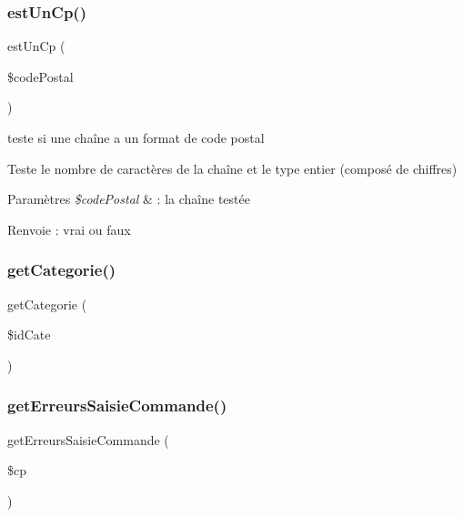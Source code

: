 \subsubsection{\texorpdfstring{est\+Un\+Cp()}{estUnCp()}}
{\footnotesize\ttfamily est\+Un\+Cp (\begin{DoxyParamCaption}\item[{}]{\$code\+Postal }\end{DoxyParamCaption})}

teste si une chaîne a un format de code postal

Teste le nombre de caractères de la chaîne et le type entier (composé de chiffres) 
\begin{DoxyParams}{Paramètres}
{\em \$code\+Postal} & \+: la chaîne testée \\
\hline
\end{DoxyParams}
\begin{DoxyReturn}{Renvoie}
\+: vrai ou faux 
\end{DoxyReturn}
\mbox{\label{fonctions_8inc_8php_a230dfdd0d0b7c24d309159bfd802ff2a}} 
\subsubsection{\texorpdfstring{get\+Categorie()}{getCategorie()}}
{\footnotesize\ttfamily get\+Categorie (\begin{DoxyParamCaption}\item[{}]{\$id\+Cate }\end{DoxyParamCaption})}

\mbox{\label{fonctions_8inc_8php_aba35060e60e80a033b2f7bf612c60b56}} 
\subsubsection{\texorpdfstring{get\+Erreurs\+Saisie\+Commande()}{getErreursSaisieCommande()}}
{\footnotesize\ttfamily get\+Erreurs\+Saisie\+Commande (\begin{DoxyParamCaption}\item[{}]{\$cp }\end{DoxyParamCaption})}

